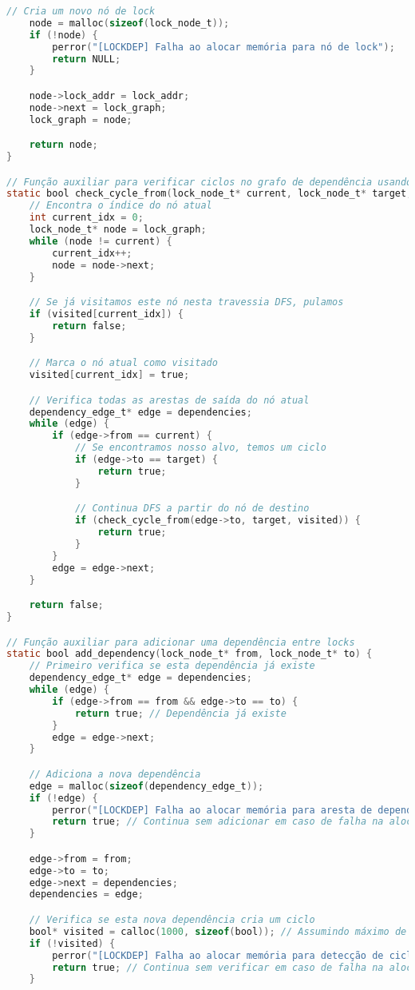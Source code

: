 \begin{lstlisting}[language=C, caption={lockdep\_core.c - Implementação do sistema de detecção de deadlocks}]
    // Cria um novo nó de lock
    node = malloc(sizeof(lock_node_t));
    if (!node) {
        perror("[LOCKDEP] Falha ao alocar memória para nó de lock");
        return NULL;
    }

    node->lock_addr = lock_addr;
    node->next = lock_graph;
    lock_graph = node;

    return node;
}

// Função auxiliar para verificar ciclos no grafo de dependência usando DFS
static bool check_cycle_from(lock_node_t* current, lock_node_t* target, bool* visited) {
    // Encontra o índice do nó atual
    int current_idx = 0;
    lock_node_t* node = lock_graph;
    while (node != current) {
        current_idx++;
        node = node->next;
    }

    // Se já visitamos este nó nesta travessia DFS, pulamos
    if (visited[current_idx]) {
        return false;
    }

    // Marca o nó atual como visitado
    visited[current_idx] = true;

    // Verifica todas as arestas de saída do nó atual
    dependency_edge_t* edge = dependencies;
    while (edge) {
        if (edge->from == current) {
            // Se encontramos nosso alvo, temos um ciclo
            if (edge->to == target) {
                return true;
            }

            // Continua DFS a partir do nó de destino
            if (check_cycle_from(edge->to, target, visited)) {
                return true;
            }
        }
        edge = edge->next;
    }

    return false;
}

// Função auxiliar para adicionar uma dependência entre locks
static bool add_dependency(lock_node_t* from, lock_node_t* to) {
    // Primeiro verifica se esta dependência já existe
    dependency_edge_t* edge = dependencies;
    while (edge) {
        if (edge->from == from && edge->to == to) {
            return true; // Dependência já existe
        }
        edge = edge->next;
    }

    // Adiciona a nova dependência
    edge = malloc(sizeof(dependency_edge_t));
    if (!edge) {
        perror("[LOCKDEP] Falha ao alocar memória para aresta de dependência");
        return true; // Continua sem adicionar em caso de falha na alocação
    }

    edge->from = from;
    edge->to = to;
    edge->next = dependencies;
    dependencies = edge;

    // Verifica se esta nova dependência cria um ciclo
    bool* visited = calloc(1000, sizeof(bool)); // Assumindo máximo de 1000 locks por simplicidade
    if (!visited) {
        perror("[LOCKDEP] Falha ao alocar memória para detecção de ciclo");
        return true; // Continua sem verificar em caso de falha na alocação
    }


\end{lstlisting}

